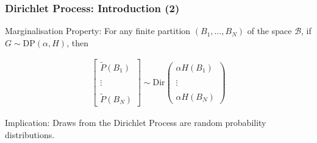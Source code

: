 \documentclass[12pt]{beamer}
\newcommand{\Dir}{\text{Dir}}
\begin{document}
\begin{frame}
    \frametitle{Dirichlet Process: Introduction (2)}

    \alert{Marginalisation Property:}
    For any finite partition $(B_1, \dots, B_N)$ of the space $\mathcal{B}$,
    if $G \sim \text{DP}(\alpha,H)$, then 

    \begin{align*}
        \begin{bmatrix}
            \tilde{P}\left(B_1\right) 
            \\\\
            \vdots
            \\\\
            \tilde{P}\left(B_N\right)
        \end{bmatrix}
        \sim \Dir
        \begin{pmatrix}
            \alpha H(B_1)
            \\\\
            \vdots
            \\\\
            \alpha H\left(B_N\right)
        \end{pmatrix}
    \end{align*}

    \bigskip

    \pause

    \alert{Implication:}
    Draws from the Dirichlet Process are random probability
    distributions.
\end{frame}
\end{document}
